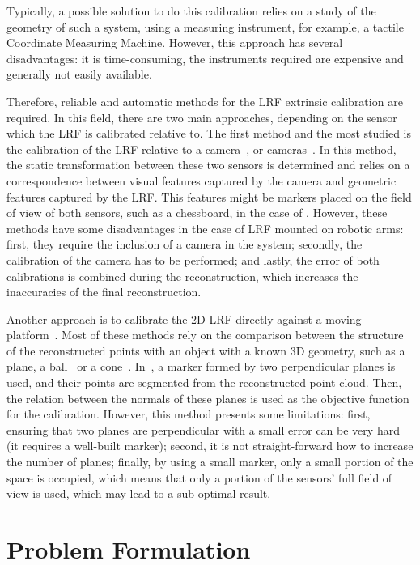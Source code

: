 \documentclass[conference]{IEEEtran}
\begin{document}
Typically, a possible solution to do this calibration relies on a study of the geometry of such a system, using a measuring instrument, for example, a tactile Coordinate Measuring Machine. However, this approach has several disadvantages: it is time-consuming, the instruments required are expensive and generally not easily available.

Therefore, reliable and automatic methods for the LRF extrinsic calibration are required. In this field, there are two main approaches, depending on the sensor which the LRF is calibrated relative to. The first method and the most studied is the calibration of the LRF relative to a camera~\cite{chen16,kassir10,zhang04}, or cameras~\cite{haeselich12}. In this method, the static transformation between these two sensors is determined and relies on a correspondence between visual features captured by the camera and geometric features captured by the LRF. This features might be markers placed on the field of view of both sensors, such as a chessboard, in the case of \cite{kassir10}. However, these methods have some disadvantages in the case of LRF mounted on robotic arms: first, they require the inclusion of a camera in the system; secondly, the calibration of the camera has to be performed; and lastly, the error of both calibrations is combined during the reconstruction, which increases the inaccuracies of the final reconstruction. 

Another approach is to calibrate the 2D-LRF directly against a moving platform~\cite{zeng18}. Most of these methods rely on the comparison between the structure of the reconstructed points with an object with a known 3D geometry, such as a plane, a ball~\cite{pereira16} or a cone~\cite{almeida12}. In~\cite{kim13}, a marker formed by two perpendicular planes is used, and their points are segmented from the reconstructed point cloud. Then, the relation between the normals of these planes is used as the objective function for the calibration. However, this method presents some limitations: first, ensuring that two planes are perpendicular with a small error can be very hard (it requires a well-built marker); second, it is not straight-forward how to increase the number of planes; finally, by using a small marker, only a small portion of the space is occupied, which means that only a portion of the sensors' full field of view is used, which may lead to a sub-optimal result.

\section{Problem Formulation}\label{section:problem-formulation}
\end{document}
